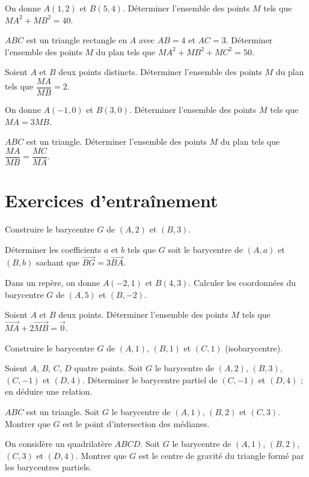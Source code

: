 \exo{}
On donne $A(1,2)$ et $B(5,4)$. Déterminer l'ensemble des points $M$ tels que $MA^2 + MB^2 = 40$.

\exo{}
$ABC$ est un triangle rectangle en $A$ avec $AB = 4$ et $AC = 3$. Déterminer l'ensemble des points $M$ du plan tels que $MA^2 + MB^2 + MC^2 = 50$.


\exo{}
Soient $A$ et $B$ deux points distincts. Déterminer l'ensemble des points $M$ du plan tels que $\dfrac{MA}{MB} = 2$.

\exo{}
On donne $A(-1,0)$ et $B(3,0)$. Déterminer l'ensemble des points $M$ tels que $MA = 3MB$.

\exo{}
$ABC$ est un triangle. Déterminer l'ensemble des points $M$ du plan tels que $\dfrac{MA}{MB} = \dfrac{MC}{MA}$.

\section{Exercices d'entraînement}


\exo{}
Construire le barycentre $G$ de $(A,2)$ et $(B,3)$.

\exo{}
Déterminer les coefficients $a$ et $b$ tels que $G$ soit le barycentre de $(A,a)$ et $(B,b)$ sachant que $\overrightarrow{BG} = 3\overrightarrow{BA}$.

\exo{}
Dans un repère, on donne $A(-2,1)$ et $B(4,3)$. Calculer les coordonnées du barycentre $G$ de $(A,5)$ et $(B,-2)$.

\exo{}
Soient $A$ et $B$ deux points. Déterminer l'ensemble des points $M$ tels que $\overrightarrow{MA} + 2\overrightarrow{MB} = \vec{0}$.


\exo{}
Construire le barycentre $G$ de $(A,1)$, $(B,1)$ et $(C,1)$ (isobarycentre).

\exo{}
Soient $A$, $B$, $C$, $D$ quatre points. Soit $G$ le barycentre de $(A,2)$, $(B,3)$, $(C,-1)$ et $(D,4)$. Déterminer le barycentre partiel de $(C,-1)$ et $(D,4)$ ; en déduire une relation.

\exo{}
$ABC$ est un triangle. Soit $G$ le barycentre de $(A,1)$, $(B,2)$ et $(C,3)$. Montrer que $G$ est le point d'intersection des médianes.

\exo{}
On considère un quadrilatère $ABCD$. Soit $G$ le barycentre de $(A,1)$, $(B,2)$, $(C,3)$ et $(D,4)$. Montrer que $G$ est le centre de gravité du triangle formé par les barycentres partiels.

